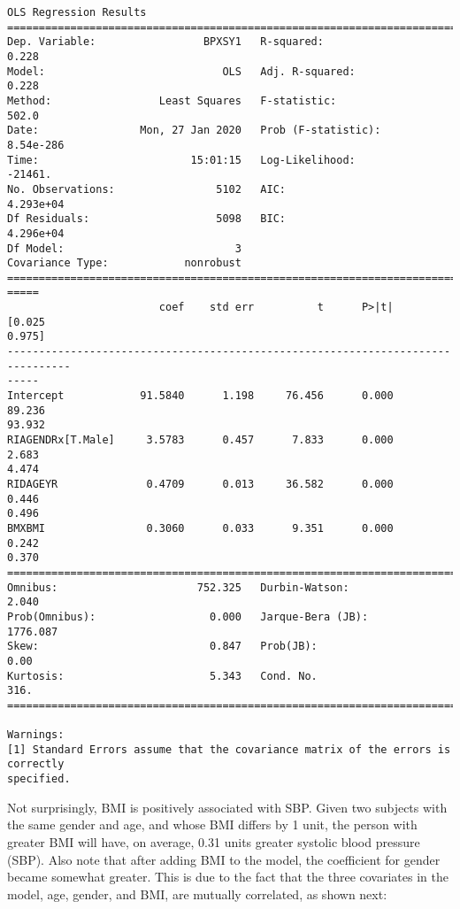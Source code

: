 \documentclass[11pt]{article}
\begin{document}
    \begin{Verbatim}[commandchars=\\\{\}]
                            OLS Regression Results
==============================================================================
Dep. Variable:                 BPXSY1   R-squared:                       0.228
Model:                            OLS   Adj. R-squared:                  0.228
Method:                 Least Squares   F-statistic:                     502.0
Date:                Mon, 27 Jan 2020   Prob (F-statistic):          8.54e-286
Time:                        15:01:15   Log-Likelihood:                -21461.
No. Observations:                5102   AIC:                         4.293e+04
Df Residuals:                    5098   BIC:                         4.296e+04
Df Model:                           3
Covariance Type:            nonrobust
================================================================================
=====
                        coef    std err          t      P>|t|      [0.025
0.975]
--------------------------------------------------------------------------------
-----
Intercept            91.5840      1.198     76.456      0.000      89.236
93.932
RIAGENDRx[T.Male]     3.5783      0.457      7.833      0.000       2.683
4.474
RIDAGEYR              0.4709      0.013     36.582      0.000       0.446
0.496
BMXBMI                0.3060      0.033      9.351      0.000       0.242
0.370
==============================================================================
Omnibus:                      752.325   Durbin-Watson:                   2.040
Prob(Omnibus):                  0.000   Jarque-Bera (JB):             1776.087
Skew:                           0.847   Prob(JB):                         0.00
Kurtosis:                       5.343   Cond. No.                         316.
==============================================================================

Warnings:
[1] Standard Errors assume that the covariance matrix of the errors is correctly
specified.
\end{Verbatim}

    Not surprisingly, BMI is positively associated with SBP. Given two
subjects with the same gender and age, and whose BMI differs by 1 unit,
the person with greater BMI will have, on average, 0.31 units greater
systolic blood pressure (SBP). Also note that after adding BMI to the
model, the coefficient for gender became somewhat greater. This is due
to the fact that the three covariates in the model, age, gender, and
BMI, are mutually correlated, as shown next:
\end{document}
